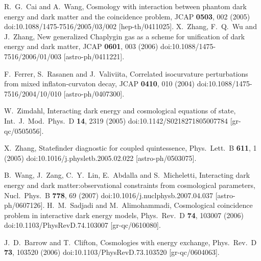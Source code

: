 \documentclass[aps,prd,nofootinbib,amsmath,amssymb,superscriptaddress,twocolumn,10pt]{revtex4}%
\begin{document}
\begin{thebibliography}{99}
  R.~G.~Cai and A.~Wang,
  Cosmology with interaction between phantom dark energy and dark matter and the coincidence problem,
  JCAP {\bf 0503}, 002 (2005)
  doi:10.1088/1475-7516/2005/03/002
  [hep-th/0411025].
  X.~Zhang, F.~Q.~Wu and J.~Zhang,
  New generalized Chaplygin gas as a scheme for unification of dark energy and dark matter,
  JCAP {\bf 0601}, 003 (2006)
  doi:10.1088/1475-7516/2006/01/003
  [astro-ph/0411221].

  F.~Ferrer, S.~Rasanen and J.~Valiviita,
  Correlated isocurvature perturbations from mixed inflaton-curvaton decay,
  JCAP {\bf 0410}, 010 (2004)
  doi:10.1088/1475-7516/2004/10/010
  [astro-ph/0407300].

  W.~Zimdahl,
  Interacting dark energy and cosmological equations of state,
  Int.\ J.\ Mod.\ Phys.\ D {\bf 14}, 2319 (2005)
  doi:10.1142/S0218271805007784
  [gr-qc/0505056].

  X.~Zhang,
  Statefinder diagnostic for coupled quintessence,
  Phys.\ Lett.\ B {\bf 611}, 1 (2005)
  doi:10.1016/j.physletb.2005.02.022
  [astro-ph/0503075].

  B.~Wang, J.~Zang, C.~Y.~Lin, E.~Abdalla and S.~Micheletti,
  Interacting dark energy and dark matter:observational constraints from cosmological parameters,
  Nucl.\ Phys.\ B {\bf 778}, 69 (2007)
  doi:10.1016/j.nuclphysb.2007.04.037
  [astro-ph/0607126].
  H.~M.~Sadjadi and M.~Alimohammadi,
  Cosmological coincidence problem in interactive dark energy models,
  Phys.\ Rev.\ D {\bf 74}, 103007 (2006)
  doi:10.1103/PhysRevD.74.103007
  [gr-qc/0610080].

  J.~D.~Barrow and T.~Clifton,
  Cosmologies with energy exchange,
  Phys.\ Rev.\ D {\bf 73}, 103520 (2006)
  doi:10.1103/PhysRevD.73.103520
  [gr-qc/0604063].


\end{thebibliography}
\end{document}
